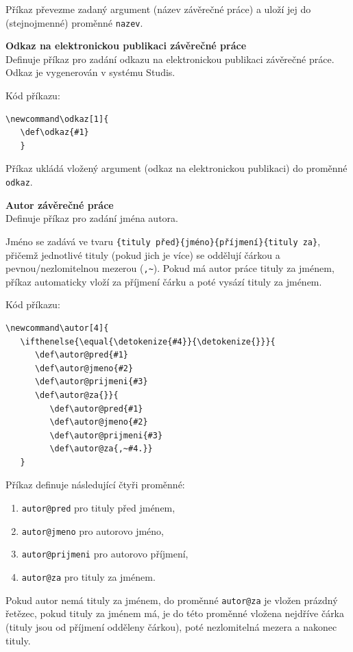 Příkaz převezme zadaný argument (název závěrečné práce) a uloží jej do (stejnojmenné) proměnné \verb|nazev|.

\vspace{8pt}

\textbf{Odkaz na elektronickou publikaci závěrečné práce}\\
Definuje příkaz pro zadání odkazu na elektronickou publikaci závěrečné práce. Odkaz je vygenerován v systému Studis.

Kód příkazu:

\begin{verbatim}
\newcommand\odkaz[1]{
   \def\odkaz{#1}
   }
\end{verbatim}

Příkaz ukládá vložený argument (odkaz na elektronickou publikaci) do proměnné \verb|odkaz|.

\vspace{8pt}

\textbf{Autor závěrečné práce}\\
Definuje příkaz pro zadání jména autora.

Jméno se zadává ve tvaru \verb|{tituly před}{jméno}{příjmení}{tituly za}|, přičemž jednotlivé tituly (pokud jich je více) se oddělují čárkou a pevnou/nezlomitelnou mezerou (\verb|,~|). Pokud má autor práce tituly za jménem, příkaz automaticky vloží za příjmení čárku a poté vysází tituly za jménem.

Kód příkazu:

\begin{verbatim}
\newcommand\autor[4]{
   \ifthenelse{\equal{\detokenize{#4}}{\detokenize{}}}{
      \def\autor@pred{#1}
      \def\autor@jmeno{#2}
      \def\autor@prijmeni{#3}
      \def\autor@za{}}{
         \def\autor@pred{#1}
         \def\autor@jmeno{#2}
         \def\autor@prijmeni{#3}
         \def\autor@za{,~#4.}}
   }
\end{verbatim}

Příkaz definuje následující čtyři proměnné:

\begin{enumerate}
	\item \verb|autor@pred| pro tituly před jménem,
	\item \verb|autor@jmeno| pro autorovo jméno,
	\item \verb|autor@prijmeni| pro autorovo příjmení,
	\item \verb|autor@za| pro tituly za jménem.
\end{enumerate}

Pokud autor nemá tituly za jménem, do proměnné \verb|autor@za| je vložen prázdný řetězec, pokud tituly za jménem má, je do této proměnné vložena nejdříve čárka (tituly jsou od příjmení odděleny čárkou), poté nezlomitelná mezera a nakonec tituly.

